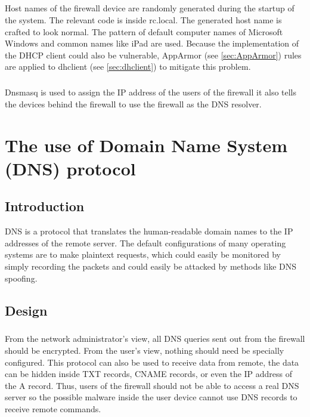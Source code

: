 \documentclass[mscthesis]{usiinfthesis}
\begin{document}
\paragraph{}
Host names of the firewall device are randomly generated during the startup of the system. The relevant code is inside rc.local. The generated host name is crafted to look normal. The pattern of default computer names of Microsoft Windows and common names like iPad are used. Because the implementation of the DHCP client could also be vulnerable, AppArmor (see \cref{sec:AppArmor}) rules are applied to dhclient (see \cref{sec:dhclient}) to mitigate this problem.
\paragraph{}
Dnsmasq is used to assign the IP address of the users of the firewall it also tells the devices behind the firewall to use the firewall as the DNS resolver.

\chapter{The use of Domain Name System (DNS) protocol}\label{cha:dns}

\section{Introduction}
DNS is a protocol that translates the human-readable domain names to the IP addresses of the remote server. The default configurations of many operating systems are to make plaintext requests, which could easily be monitored by simply recording the packets and could easily be attacked by methods like DNS spoofing.

\section{Design}
\paragraph{}
From the network administrator's view, all DNS queries sent out from the firewall should be encrypted. From the user's view, nothing should need be specially configured. This protocol can also be used to receive data from remote, the data can be hidden inside TXT records, CNAME records, or even the IP address of the A record. Thus, users of the firewall should not be able to access a real DNS server so the possible malware inside the user device cannot use DNS records to receive remote commands.
\end{document}
